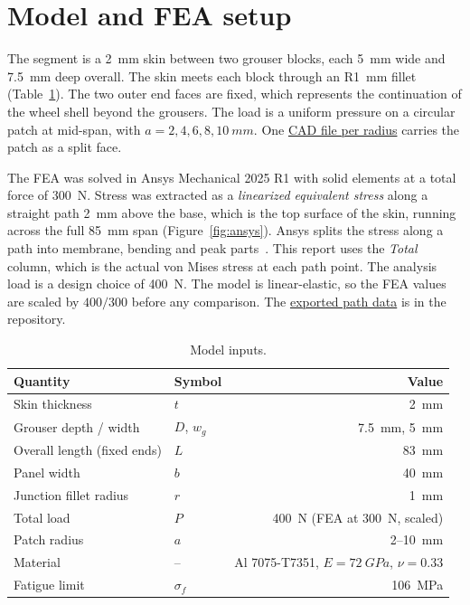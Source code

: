 \documentclass[11pt,a4paper]{article}
\newcommand{\repo}{https://github.com/Shass27/curiosity-perseverance-wheel-fea}
\newcommand{\tree}{\repo/tree/main}
\begin{document}
\section{Model and FEA setup}

The segment is a \SI{2}{mm} skin between two grouser blocks, each \SI{5}{mm} wide and \SI{7.5}{mm} deep overall. The skin meets each block through an R\SI{1}{mm} fillet (Table~\ref{tab:inputs}). The two outer end faces are fixed, which represents the continuation of the wheel shell beyond the grousers. The load is a uniform pressure on a circular patch at mid-span, with $a = 2, 4, 6, 8, \SI{10}{mm}$. One \href{\tree/CAD_models/Tier\%201}{CAD file per radius} carries the patch as a split face.

The FEA was solved in Ansys Mechanical 2025 R1 with solid elements at a total force of \SI{300}{N}. Stress was extracted as a \emph{linearized equivalent stress} along a straight path \SI{2}{mm} above the base, which is the top surface of the skin, running across the full \SI{85}{mm} span (Figure~\ref{fig:ansys}). Ansys splits the stress along a path into membrane, bending and peak parts~\cite{ansys}. This report uses the \emph{Total} column, which is the actual von Mises stress at each path point. The analysis load is a design choice of \SI{400}{N}. The model is linear-elastic, so the FEA values are scaled by $400/300$ before any comparison. The \href{\tree/Simulation\%20results/Tier\%201}{exported path data} is in the repository.

\begin{table}[h]
  \centering
  \caption{Model inputs.}
  \label{tab:inputs}
  \begin{tabular}{llr}
    \toprule
    Quantity & Symbol & Value \\
    \midrule
    Skin thickness & $t$ & \SI{2}{mm} \\
    Grouser depth / width & $D$, $w_g$ & \SI{7.5}{mm}, \SI{5}{mm} \\
    Overall length (fixed ends) & $L$ & \SI{83}{mm} \\
    Panel width & $b$ & \SI{40}{mm} \\
    Junction fillet radius & $r$ & \SI{1}{mm} \\
    Total load & $P$ & \SI{400}{N} (FEA at \SI{300}{N}, scaled) \\
    Patch radius & $a$ & 2--\SI{10}{mm} \\
    Material & -- & Al 7075-T7351, $E = \SI{72}{GPa}$, $\nu = 0.33$ \\
    Fatigue limit & $\sigma_f$ & \SI{106}{MPa} \\
    \bottomrule
  \end{tabular}
\end{table}
\end{document}
